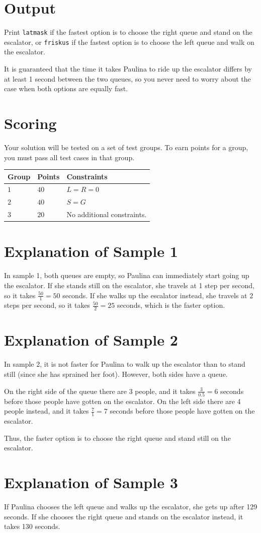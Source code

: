 \section*{Output}
Print \texttt{latmask} if the fastest option is to choose the right queue and stand on the escalator, or \texttt{friskus} if the fastest option is to choose the left queue and walk on the escalator.

It is guaranteed that the time it takes Paulina to ride up the escalator differs by at least 1 second between the two queues, so you never need to worry about the case when both options are equally fast.

\section*{Scoring}
Your solution will be tested on a set of test groups.
To earn points for a group, you must pass all test cases in that group.

\noindent
\begin{tabular}{| l | l | p{12cm} |}
  \hline
  Group & Points & Constraints \\ \hline
    $1$   & $40$     & $L = R = 0$ \\ \hline
    $2$   & $40$     & $S = G$ \\ \hline
    $3$   & $20$     & No additional constraints. \\ \hline
\end{tabular}

\section*{Explanation of Sample 1}
In sample 1, both queues are empty, so Paulina can immediately start going up the escalator.
If she stands still on the escalator, she travels at 1 step per second, so it takes $\frac{50}{1} = 50$ seconds.
If she walks up the escalator instead, she travels at 2 steps per second, so it takes $\frac{50}{2} = 25$ seconds, which is the faster option.

\section*{Explanation of Sample 2}
In sample 2, it is not faster for Paulina to walk up the escalator than to stand still (since she has sprained her foot).
However, both sides have a queue.

On the right side of the queue there are 3 people, and it takes $\frac{3}{0.5} = 6$ seconds before those people have gotten on the escalator.
On the left side there are 4 people instead, and it takes $\frac{7}{1} = 7$ seconds before those people have gotten on the escalator.

Thus, the faster option is to choose the right queue and stand still on the escalator.

\section*{Explanation of Sample 3}
If Paulina chooses the left queue and walks up the escalator, she gets up after 129 seconds.
If she chooses the right queue and stands on the escalator instead, it takes 130 seconds.

